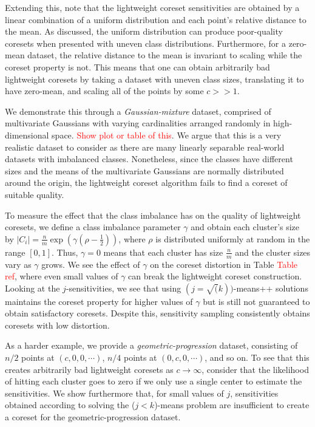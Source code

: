 Extending this, note that the lightweight coreset sensitivities are obtained by a linear combination of a uniform distribution and each point's relative
distance to the mean. As discussed, the uniform distribution can produce poor-quality coresets when presented with uneven class distributions. Furthermore, for
a zero-mean dataset, the relative distance to the mean is invariant to scaling while the coreset property is not. This means that one can obtain arbitrarily
bad lightweight coresets by taking a dataset with uneven class sizes, translating it to have zero-mean, and scaling all of the points by some $c >> 1$.

We demonstrate this through a \emph{Gaussian-mixture} dataset, comprised of multivariate Gaussians with varying cardinalities arranged randomly in
high-dimensional space. \textcolor{red}{Show plot or table of this}. We argue that this is a very realistic dataset to consider as there are many linearly
separable real-world datasets with imbalanced classes. Nonetheless, since the classes have different sizes and the means of the multivariate Gaussians are
normally distributed around the origin, the lightweight coreset algorithm fails to find a coreset of suitable quality. 

To measure the effect that the class imbalance has on the quality of lightweight coresets, we define a class imbalance parameter $\gamma$ and obtain each
cluster's size by $|C_i| = \frac{n}{m} \exp \left( \gamma(\rho - \frac{1}{2}) \right)$, where $\rho$ is distributed uniformly at random in the range $[0, 1]$.
Thus, $\gamma = 0$ means that each cluster has size $\frac{n}{m}$ and the cluster sizes vary as $\gamma$ grows. We see the effect of $\gamma$ on the coreset
distortion in Table \textcolor{red}{Table ref}, where even small values of $\gamma$ can break the lightweight coreset construction. Looking at the
$j$-sensitivities, we see that using $(j=\sqrt(k))$-means++ solutions maintains the coreset property for higher values of $\gamma$ but is still not guaranteed
to obtain satisfactory coresets. Despite this, sensitivity sampling consistently obtains coresets with low distortion.

As a harder example, we provide a \emph{geometric-progression} dataset, consisting of $n/2$ points at $(c, 0, 0, \cdots)$, $n/4$ points at $(0, c, 0, \cdots)$,
and so on. To see that this creates arbitrarily bad lightweight coresets as $c \rightarrow \infty$, consider that the likelihood of hitting each cluster goes to
zero if we only use a single center to estimate the sensitivities. We show furthermore that, for small values of $j$, sensitivities obtained
according to solving the ($j<k$)-means problem are insufficient to create a coreset for the geometric-progression dataset.

